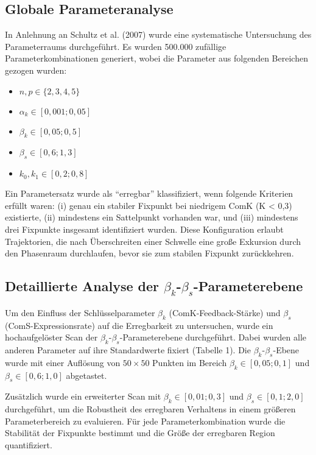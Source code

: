 \documentclass[11pt]{article}
\begin{document}
\subsection{Globale Parameteranalyse}
In Anlehnung an Schultz et al. (2007) \cite{schultz2007} wurde eine systematische Untersuchung des Parameterraums durchgeführt. Es wurden 500.000 zufällige Parameterkombinationen generiert, wobei die Parameter aus folgenden Bereichen gezogen wurden:

\begin{itemize}
    \item \( n, p \in \{2, 3, 4, 5\} \)
    \item \( \alpha_k \in [0{,}001; 0{,}05] \)
    \item \( \beta_k \in [0{,}05; 0{,}5] \)
    \item \( \beta_s \in [0{,}6; 1{,}3] \)
    \item \( k_0, k_1 \in [0{,}2; 0{,}8] \)
\end{itemize}

Ein Parametersatz wurde als ``erregbar'' klassifiziert, wenn folgende Kriterien erfüllt waren: (i) genau ein stabiler Fixpunkt bei niedrigem ComK (K < 0,3) existierte, (ii) mindestens ein Sattelpunkt vorhanden war, und (iii) mindestens drei Fixpunkte insgesamt identifiziert wurden. Diese Konfiguration erlaubt Trajektorien, die nach Überschreiten einer Schwelle eine große Exkursion durch den Phasenraum durchlaufen, bevor sie zum stabilen Fixpunkt zurückkehren.

\subsection{Detaillierte Analyse der $\beta_k$-$\beta_s$-Parameterebene}
Um den Einfluss der Schlüsselparameter $\beta_k$ (ComK-Feedback-Stärke) und $\beta_s$ (ComS-Expressionsrate) auf die Erregbarkeit zu untersuchen, wurde ein hochaufgelöster Scan der $\beta_k$-$\beta_s$-Parameterebene durchgeführt. Dabei wurden alle anderen Parameter auf ihre Standardwerte fixiert (Tabelle 1). Die $\beta_k$-$\beta_s$-Ebene wurde mit einer Auflösung von $50 \times 50$ Punkten im Bereich $\beta_k \in [0,05; 0,1]$ und $\beta_s \in [0,6; 1,0]$ abgetastet.

Zusätzlich wurde ein erweiterter Scan mit $\beta_k \in [0,01; 0,3]$ und $\beta_s \in [0,1; 2,0]$ durchgeführt, um die Robustheit des erregbaren Verhaltens in einem größeren Parameterbereich zu evaluieren. Für jede Parameterkombination wurde die Stabilität der Fixpunkte bestimmt und die Größe der erregbaren Region quantifiziert.
\end{document}
